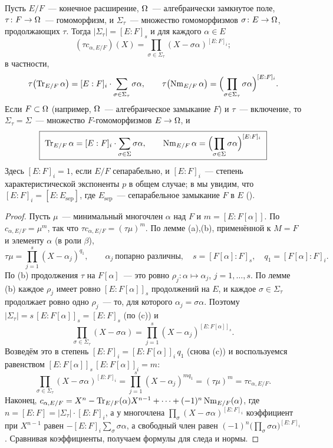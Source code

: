 \begin{proposition}[5.47]
Пусть $E/F$~--- конечное расширение, $\Omega$~--- алгебраически замкнутое поле, $\tau\colon F\to\Omega$~--- гомоморфизм, и
$\Sigma_\tau$~--- множество гомоморфизмов $\sigma\colon E\to\Omega$, продолжающих $\tau$. Тогда $|\Sigma_\tau|=[E:F]_s$ и
для каждого $\alpha\in E$
\[
(\tau c_{\alpha,E/F})(X)=\prod_{\sigma\in\Sigma_\tau}(X-\sigma\alpha)^{[E:F]_i};
\]
в частности,
\[
\tau\bigl(\operatorname{Tr}_{E/F}\alpha\bigr)=[E:F]_i\cdot\sum_{\sigma\in\Sigma_\tau}\sigma\alpha,\qquad
\tau\bigl(\operatorname{Nm}_{E/F}\alpha\bigr)=\Bigl(\prod_{\sigma\in\Sigma_\tau}\sigma\alpha\Bigr)^{[E:F]_i}.
\]
Если $F\subset\Omega$ (например, $\Omega$~--- алгебраическое замыкание $F$) и $\tau$~--- включение, то $\Sigma_\tau=\Sigma$~---
множество $F$-гомоморфизмов $E\to\Omega$, и
\[
\boxed{\ \Tr_{E/F}\alpha=[E:F]_i\cdot\sum_{\sigma\in\Sigma}\sigma\alpha,\qquad
\Nm_{E/F}\alpha=\Bigl(\prod_{\sigma\in\Sigma}\sigma\alpha\Bigr)^{[E:F]_i}\ }
\]
Здесь $[E:F]_i=1$, если $E/F$ сепарабельно, и $[E:F]_i$~--- степень характеристической экспоненты $p$ в общем случае;
в  мы увидим, что $[E:F]_i=[E:E_{\mathrm{sep}}]$, где $E_{\mathrm{sep}}$~--- сепарабельное замыкание $F$ в $E$ ().
\end{proposition}

\begin{proof}
Пусть $\mu$~--- минимальный многочлен $\alpha$ над $F$ и $m=[E:F[\alpha]]$. По  $c_{\alpha,E/F}=\mu^m$, так что
$\tau c_{\alpha,E/F}=(\tau\mu)^m$. По лемме (a),(b), применённой к $M=F$ и элементу $\alpha$ (в роли $\beta$),
\[
\tau\mu=\prod_{j=1}^s(X-\alpha_j)^{q_1},\qquad \alpha_j\ \text{попарно различны},\quad s=[F[\alpha]:F]_s,\quad
q_1=[F[\alpha]:F]_i .
\]
По (b) продолжения $\tau$ на $F[\alpha]$~--- это ровно $\rho_j\colon\alpha\mapsto\alpha_j$, $j=1,\dots,s$. По лемме
(b) каждое $\rho_j$ имеет ровно $[E:F[\alpha]]_s$ продолжений на $E$, и каждое $\sigma\in\Sigma_\tau$
продолжает ровно одно $\rho_j$~--- то, для которого $\alpha_j=\sigma\alpha$. Поэтому $|\Sigma_\tau|=s\,[E:F[\alpha]]_s=
[E:F]_s$ (по (c)) и
\[
\prod_{\sigma\in\Sigma_\tau}(X-\sigma\alpha)=\prod_{j=1}^s(X-\alpha_j)^{[E:F[\alpha]]_s}.
\]
Возведём это в степень $[E:F]_i=[E:F[\alpha]]_i\,q_1$ (снова (c)) и воспользуемся равенством
$[E:F[\alpha]]_s\,[E:F[\alpha]]_i=m$:
\[
\prod_{\sigma\in\Sigma_\tau}(X-\sigma\alpha)^{[E:F]_i}=\prod_{j=1}^s(X-\alpha_j)^{mq_1}=(\tau\mu)^m=\tau c_{\alpha,E/F}.
\]
Наконец, $c_{\alpha,E/F}=X^n-\operatorname{Tr}_{E/F}(\alpha)X^{n-1}+\dots+(-1)^n\operatorname{Nm}_{E/F}(\alpha)$, где $n=[E:F]=|\Sigma_\tau|\cdot[E:F]_i$,
а у многочлена $\prod_\sigma(X-\sigma\alpha)^{[E:F]_i}$ коэффициент при $X^{n-1}$ равен $-[E:F]_i\sum_\sigma\sigma\alpha$, а
свободный член равен $(-1)^n\bigl(\prod_\sigma\sigma\alpha\bigr)^{[E:F]_i}$. Сравнивая коэффициенты, получаем формулы для
следа и нормы.
\end{proof}

